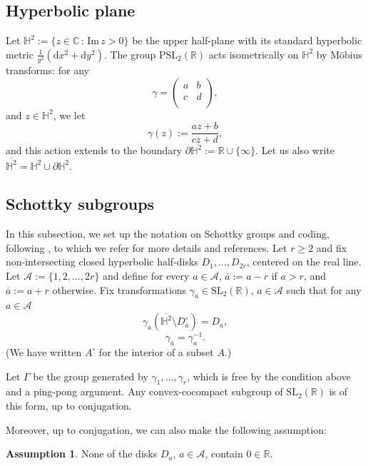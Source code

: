 \documentclass[12pt]{amsart}
\newcommand{\C}{\mathbb{C}}
\newcommand{\R}{\mathbb{R}}
\newcommand*\deriv{
	\mathrm{d}
}
\theoremstyle{definition}
\newtheorem*{assumption}{Assumption}
\renewcommand{\geq}{\geqslant}
\begin{document}
 \subsection{Hyperbolic plane}
 Let $\mathbb{H}^2 := \{z\in\C\,:\,\mathrm{Im}\,z > 0\}$ be the upper half-plane with its standard hyperbolic metric $\frac{1}{y^2}\left(\deriv x^2 + \deriv y^2\right)$. The group $\mathrm{PSL}_2(\R)$ acts isometrically on $\mathbb{H}^2 $ by Möbius transforms: for any \[\gamma = \left({\begin{array}{cc}
   a & b \\
   c & d \\
  \end{array} } \right),\] and $z\in \mathbb{H}^2$, we let \[\gamma(z) := \frac{az + b}{cz + d},\] and this action extends to the boundary $\partial\mathbb{H}^2 := \R\cup\{\infty\}$. Let us also write $\overline{\mathbb{H}^2} = \mathbb{H}^2 \cup \partial\mathbb{H}^2$.
\subsection{Schottky subgroups} \label{subsect:schottky}

In this subsection, we set up the notation on Schottky groups and coding, following \cite[\S2]{BD}, to which we refer for more details and references. Let $r \geq 2$ and fix non-intersecting closed hyperbolic half-disks $D_1, \ldots, D_{2r}$, centered on the real line. Let $\mathcal{A} := \{1, 2, \ldots, 2r\}$ and define for every $a \in \mathcal{A}$,
$\overline{a} := a - r$ if $a > r$, and $\overline{a} := a + r$ otherwise. Fix transformations $\gamma_a \in \mathrm{SL}_2(\R)$, $a \in \mathcal{A}$ such that for any $a \in \mathcal{A}$
\begin{equation}
\gamma_a\left(\overline{\mathbb{H}^2} \setminus D_{\overline{a}}^\circ\right) = D_a,
\label{eq:schottky}
\end{equation}
\[\gamma_{\overline{a}} = \gamma_a^{-1}.\]
(We have written $A^\circ$ for the interior of a subset $A$.) 

Let $\Gamma$ be the group generated by $\gamma_1, \ldots, \gamma_r$, which is free by the condition above and a ping-pong argument. Any convex-cocompact subgroup of $\mathrm{SL}_2(\R)$ is of this form, up to conjugation.

Moreover, up to conjugation, we can also make the following assumption:
\begin{assumption}
None of the disks $D_a$, $a \in \mathcal{A}$, contain $0 \in \R$.
\end{assumption}
\end{document}
